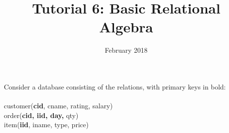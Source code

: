 \documentclass{article}
\title{Tutorial 6: Basic Relational Algebra}
\date{February 2018}
\begin{document}
	\maketitle

\noindent Consider a database consisting of the relations, with primary keys in bold:\\
\\
customer(\textbf{cid}, cname, rating, salary)\\
order(\textbf{cid, iid, day,} qty)\\
item(\textbf{iid}, iname, type, price)

%
%
\end{document}
